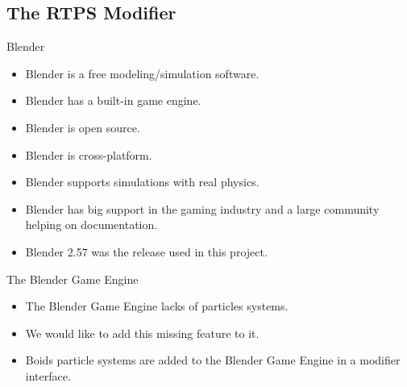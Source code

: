 \documentclass[red]{beamer}
\begin{document}
\subsection{The RTPS Modifier}

\begin{frame}{Blender}
	\begin{itemize}
		\pause \item Blender is a free modeling/simulation software.
		\pause \item Blender has a built-in game engine.
		\pause \item Blender is open source.
		\pause \item Blender is cross-platform.
		\pause \item Blender supports simulations with real physics.
		\pause \item Blender has big support in the gaming industry and a large community helping on documentation.
		\pause \item Blender 2.57 was the release used in this project.
	\end{itemize}
\end{frame}

\begin{frame}{The Blender Game Engine}
	\begin{itemize}
		\pause \item The Blender Game Engine lacks of particles systems.
		\pause \item We would like to add this missing feature to it.
		\pause \item Boids particle systems are added to the Blender Game Engine in a modifier interface.
	\end{itemize}
\end{frame}
\end{document}
